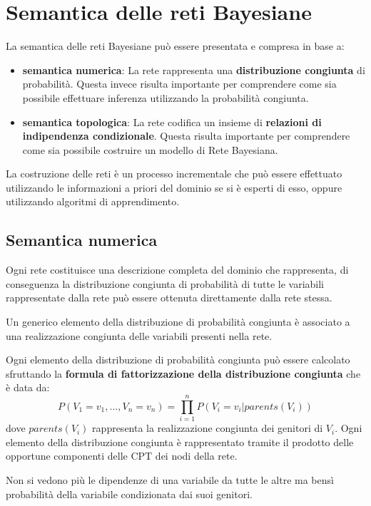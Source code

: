 \section{Semantica delle reti Bayesiane}
La semantica delle reti Bayesiane può essere presentata e compresa in base a:
\begin{itemize}
    \item \textbf{semantica numerica}: La rete rappresenta una \textbf{distribuzione congiunta} di probabilità.
          Questa invece risulta importante per comprendere come sia possibile
          effettuare inferenza utilizzando la probabilità congiunta.
    \item \textbf{semantica topologica}: La rete codifica un insieme di
          \textbf{relazioni di indipendenza condizionale}. Questa
          risulta importante per comprendere come sia possibile costruire un
          modello di Rete Bayesiana.
\end{itemize}


La costruzione delle reti è un processo incrementale che può essere effettuato
utilizzando le informazioni a priori del dominio se si è esperti di esso, oppure
utilizzando algoritmi di apprendimento.

\subsection{Semantica numerica}
Ogni rete costituisce una descrizione completa del dominio che rappresenta, di
conseguenza la distribuzione congiunta di probabilità di tutte le variabili
rappresentate dalla rete può essere ottenuta direttamente dalla rete stessa.

Un generico elemento della distribuzione di probabilità congiunta è associato a
una realizzazione congiunta delle variabili presenti nella rete.

Ogni elemento della distribuzione di probabilità congiunta può essere calcolato
sfruttando la \textbf{formula di fattorizzazione della distribuzione congiunta}
che è data da:
\begin{equation}
    P(V_1 = v_1,...,V_n = v_n) = \prod_{i=1}^{n} P(V_i=v_i|parents(V_i))
\end{equation}
dove $parents(V_i)$ rappresenta la realizzazione congiunta dei genitori di $V_i$.
Ogni elemento della distribuzione congiunta è rappresentato tramite il prodotto
delle opportune componenti delle CPT dei nodi della rete.

\begin{nota}
    Non si vedono più le dipendenze di una variabile da tutte le altre ma bensì
    probabilità della variabile condizionata dai suoi genitori.
\end{nota}

